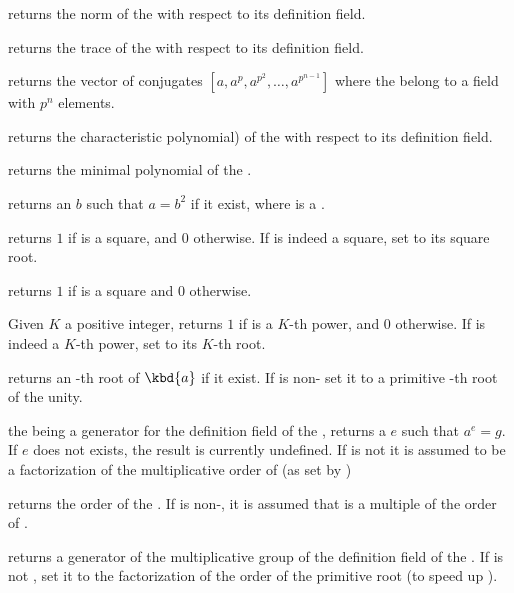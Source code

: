  returns the norm of the   with
respect to its definition field.

 returns the trace of the   with
respect to its definition field.

 returns the vector of conjugates
$[a,a^p,a^{p^2},\ldots,a^{p^{n-1}}]$ where the   belong to a
field with $p^n$ elements.

 returns the characteristic polynomial) of the
  with respect to its definition field.

 returns the minimal polynomial of
the  .

 returns an  $b$ such that $a=b^2$ if
it exist, where  is a .

 returns $1$ if  is a
square, and $0$ otherwise. If  is indeed a square, set  to its
square root.

 returns $1$ if  is a square and $0$
otherwise.

 Given $K$ a positive integer,
returns $1$ if  is a $K$-th power, and $0$ otherwise. If  is
indeed a $K$-th power, set  to its $K$-th root.

 returns an -th root of
$\kbd{a}$ if it exist. If  is non- set it to a primitive
-th root of the unity.

 the   being a
generator for the definition field of the  , returns a
 $e$ such that $a^e=g$.  If $e$ does not exists, the result is
currently undefined. If  is not  it is assumed to be a
factorization of the multiplicative order of  (as set by
)

 returns the order of the  .
If  is non-, it is assumed that  is a multiple of the
order of .

 returns a generator of the
multiplicative group of the definition field of the  .
If  is not , set it to the factorization of the order
of the primitive root (to speed up ).

